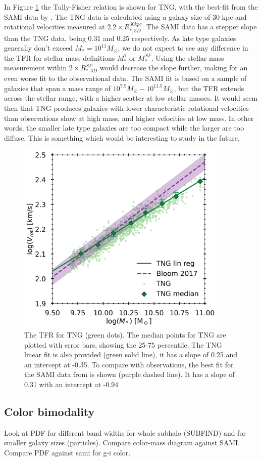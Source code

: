 In Figure \ref{TFR} the Tully-Fisher relation is shown for TNG, with the best-fit from the SAMI data by \textcite{Bloom2017}. The TNG data is calculated using a galaxy size of 30 kpc and rotational velocities measured at $2.2 \times R_{*, 3D}^{30kpc}$. The SAMI data has a stepper slope than the TNG data, being 0.31 and 0.25 respectively. As late type galaxies generally don't exceed $M_* = 10^{11} M_{\odot}$, we do not expect to see any difference in the TFR for stellar mass definitions $M_*^1$ or $M_*^{SF}$. Using the stellar mass measurement within $2 \times R_{*, 3D}^{SF}$ would decrease the slope further, making for an even worse fit to the observational data. The SAMI fit is based on a sample of galaxies that span a mass range of $10^{7.5} M_{\odot} - 10^{11.5} M_{\odot}$, but the TFR extends across the stellar range, with a higher scatter at low stellar masses. It would seem then that TNG produces galaxies with lower characteristic rotational velocities than observations show at high mass, and higher velocities at low mass. In other words, the smaller late type galaxies are too compact while the larger are too diffuse. This is something which would be interesting to study in the future.

\begin{figure}
    \centering
    \includegraphics[width=0.9\textwidth]{images/TFR.png}
    \caption{The TFR for TNG (green dots). The median points for TNG are plotted with error bars, showing the 25-75 percentile. The TNG linear fit is also provided (green solid line), it has a slope of 0.25 and an intercept at -0.35. To compare with observations, the best fit for the SAMI data from \textcite{Bloom2017} is shown (purple dashed line). It has a slope of 0.31 with an intercept at -0.94 }
    \label{TFR}
\end{figure}

\subsection{Color bimodality}

Look at PDF for different band widths for whole subhalo (SUBFIND) and for smaller galaxy sizes (particles).
Compare color-mass diagram against SAMI.
Compare PDF against sami for g-i color.


